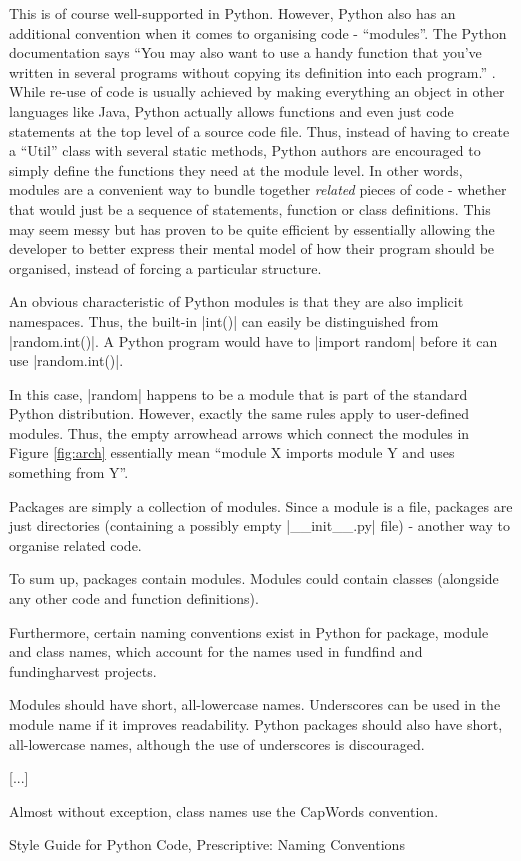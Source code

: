 This is of course well-supported in Python. However, Python also has an additional convention when it comes to organising code - ``modules''. The Python documentation says ``You may also want to use a handy function that you’ve written in several programs without copying its definition into each program.'' \cite{python-doc-modules}. While re-use of code is usually achieved by making everything an object in other languages like Java, Python actually allows functions and even just code statements at the top level of a source code file. Thus, instead of having to create a ``Util'' class with several static methods, Python authors are encouraged to simply define the functions they need at the module level. In other words, modules are a convenient way to bundle together \emph{related} pieces of code - whether that would just be a sequence of statements, function or class definitions. This may seem messy but has proven to be quite efficient by essentially allowing the developer to better express their mental model 
of how their program should be organised, instead of forcing a particular structure.

An obvious characteristic of Python modules is that they are also implicit namespaces. Thus, the built-in |int()| can easily be distinguished from |random.int()|. A Python program would have to |import random| before it can use |random.int()|.

In this case, |random| happens to be a module that is part of the standard Python distribution. However, exactly the same rules apply to user-defined modules. Thus, the empty arrowhead arrows which connect the modules in Figure \ref{fig:arch} essentially mean ``module X imports module Y and uses something from Y''.

Packages are simply a collection of modules. Since a module is a file, packages are just directories (containing a possibly empty |__init__.py| file) - another way to organise related code.

To sum up, packages contain modules. Modules could contain classes (alongside any other code and function definitions).

Furthermore, certain naming conventions exist in Python for package, module and class names, which account for the names used in fundfind and fundingharvest projects.

\begin{shadequote}
Modules should have short, all-lowercase names. Underscores can be used in the module name if it improves readability. Python packages should also have short, all-lowercase names, although the use of underscores is discouraged.

[...]

Almost without exception, class names use the CapWords convention.

Style Guide for Python Code, Prescriptive: Naming Conventions \cite{pep8}
\end{shadequote}


